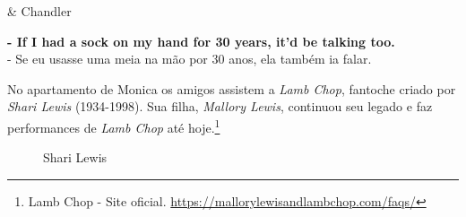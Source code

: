 \begin{tcolorbox}[enhanced,center upper,
    drop fuzzy shadow southeast, boxrule=0.3pt,
    lower separated=false, breakable,
    colframe=black!30!dialogoBorder,colback=white]
\begin{minipage}[c]{0.16\linewidth}
   & \centering \scriptsize{Chandler}
\end{minipage}
\hfill
\begin{minipage}[c]{0.8\linewidth}
  \textbf{- If I had a sock on my hand for 30 years, it'd be talking too.}\\
  - Se eu usasse uma meia na mão por 30 anos, ela também ia falar.
\end{minipage}
\end{tcolorbox}

No apartamento de Monica os amigos assistem a \emph{Lamb Chop}, fantoche
criado por \emph{Shari Lewis} (1934-1998). Sua filha, \emph{Mallory
Lewis}, continuou seu legado e faz performances de \emph{Lamb Chop} até
hoje.\footnote{\sloppy Lamb Chop - Site oficial. \url{https://mallorylewisandlambchop.com/faqs/}}

\begin{figure}
  \centering
    \caption{Shari Lewis\label{fig:shari-lewis}}
\end{figure}
